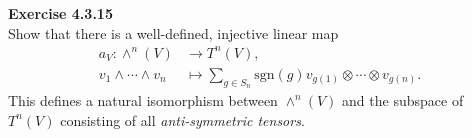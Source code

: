 \documentclass[a4paper, 12pt]{article}
\newenvironment{problem}[2][Exercise]
    { \begin{mdframed}[backgroundcolor=gray!20] \textbf{#1 #2} \\}
    {  \end{mdframed}}
\begin{document}
\begin{problem}{4.3.15}
Show that there is a well-defined, injective linear map 
\begin{align*}
	a_V:\wedge^n(V) &\rightarrow T^n(V),\\ 
	  v_1\wedge \cdots \wedge v_n &\mapsto \sum_{g\in S_n} \text{sgn}(g)v_{g(1)}\otimes \cdots \otimes v_{g(n)}.
\end{align*}
This defines a natural isomorphism between \(\wedge^n(V)\) and the subspace of \(T^n(V)\) consisting of all \textit{anti-symmetric tensors}.
\end{problem}
\end{document}

